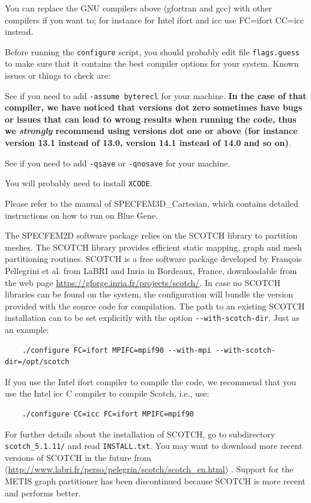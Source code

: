 \documentclass[oneside,english,onecolumn,letterpaper]{book}
\newcommand{\urlwithparentheses}[1]{(\url{#1})}
\begin{document}
You can replace the GNU compilers above (gfortran and gcc) with other compilers if you want to; for instance for Intel ifort and icc use FC=ifort CC=icc instead.

Before running the \texttt{configure} script, you should probably edit file \texttt{flags.guess} to make sure that it contains the best compiler options for your system. Known issues or things to check are:

\begin{description}[font=\ttfamily]
\item [Intel ifort compiler] See if you need to add \texttt{-assume byterecl} for your machine. \textbf{In the case of that compiler, we have noticed that versions dot zero sometimes have bugs or issues that can lead to wrong results when running the code, thus we \emph{strongly} recommend using versions dot one or above (for instance version 13.1 instead of 13.0, version 14.1 instead of 14.0 and so on)}.
\item [IBM compiler] See if you need to add \texttt{-qsave} or \texttt{-qnosave} for your machine.
\item [Mac OS] You will probably need to install \texttt{XCODE}.
\item [IBM Blue Gene machines] Please refer to the manual of SPECFEM3D\_Cartesian, which contains detailed instructions on how to run on Blue Gene.
\end{description}

The SPECFEM2D software package relies on the SCOTCH library to partition meshes.
The SCOTCH library \citep{PeRo96}
provides efficient static mapping, graph and mesh partitioning routines. SCOTCH is a free software package developed by
Fran\c{c}ois Pellegrini et al. from LaBRI and Inria in Bordeaux, France, downloadable from the web page \url{https://gforge.inria.fr/projects/scotch/}.
In case no SCOTCH libraries can be found on the system, the configuration will bundle the version provided with the source code for compilation.
The path to an existing SCOTCH installation can to be set explicitly with the option \texttt{-{}-with-scotch-dir}.
Just as an example:
%
\begin{verbatim}
    ./configure FC=ifort MPIFC=mpif90 --with-mpi --with-scotch-dir=/opt/scotch
\end{verbatim}
%
If you use the Intel ifort compiler to compile the code, we recommend that you use the Intel icc C compiler to compile Scotch, i.e., use:
%
\begin{verbatim}
    ./configure CC=icc FC=ifort MPIFC=mpif90
\end{verbatim}
%
For further details about the installation of SCOTCH,
go to subdirectory \texttt{scotch\_5.1.11/} and read \texttt{INSTALL.txt}. You may want to download more recent versions of SCOTCH in the future from \urlwithparentheses{http://www.labri.fr/perso/pelegrin/scotch/scotch_en.html} . Support for the METIS graph partitioner has been discontinued because SCOTCH is more recent and performs better.
\end{document}
